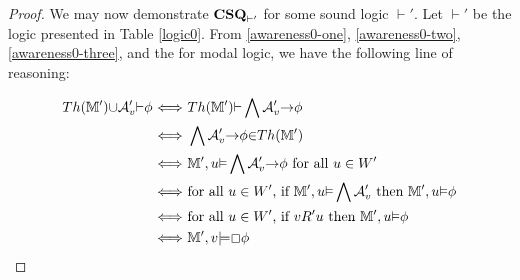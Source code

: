 \begin{proof}
  We may now demonstrate $\textup{{\bfseries{CSQ}}}_{\vdash'}$ for some
  sound logic $\vdash'$.  Let $\vdash'$ be the logic presented in
  Table \ref{logic0}.  From \eqref{awareness0-one}, \eqref{awareness0-two}, \eqref{awareness0-three},
  and the  for modal logic, we have the following
  line of reasoning:
  
  \begin{align*}
    Th({\mathbbm{M}}'){\cup}\mathcal{A}'_v{\vdash}{\phi}\ &
    {\Longleftrightarrow}\ Th({\mathbbm{M}}'){\vdash}\bigwedge\mathcal{A}'_v{\rightarrow}{\phi}\\
    &
    {\Longleftrightarrow}\ \bigwedge\mathcal{A}'_v{\rightarrow}{\phi}{\in}Th({\mathbbm{M}}')\\
    &
    {\Longleftrightarrow}\ {\mathbbm{M}}',u{\vDash}\bigwedge\mathcal{A}'_v{\rightarrow}{\phi}\text{
    for all $u \in W'$}\\
    & {\Longleftrightarrow}\ \text{for all $u \in W'$, if
    }{\mathbbm{M}}',u{\vDash}\bigwedge\mathcal{A}'_v\text{ then
    }{\mathbbm{M}}',u{\vDash}{\phi}\\
    & {\Longleftrightarrow}\ \text{for all $u \in W'$, if }v R 'u \text{ then
    }{\mathbbm{M}}',u{\vDash}{\phi}\\
    & {\Longleftrightarrow}\ {\mathbbm{M}}',v{\models}\Box{\phi}
  \end{align*}
\end{proof}

